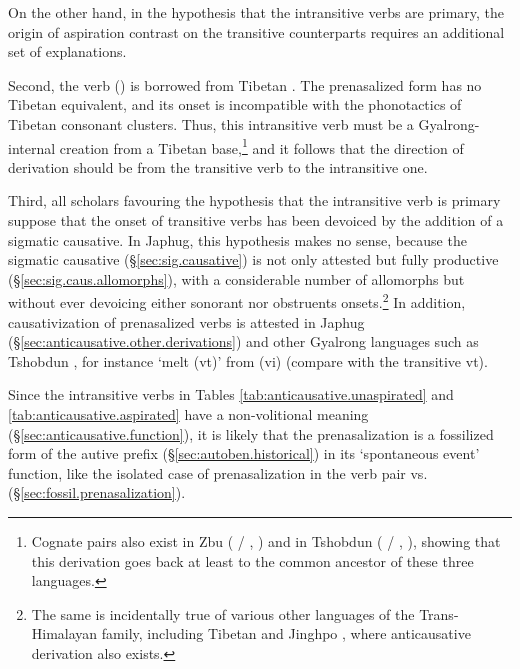 On the other hand, in the hypothesis that the intransitive verbs are primary, the origin of aspiration contrast on the transitive counterparts requires an additional set of explanations.

Second, the verb  () is borrowed from Tibetan . The prenasalized form  has no Tibetan equivalent, and its onset  is incompatible with the phonotactics of Tibetan consonant clusters. Thus, this intransitive verb must be a Gyalrong-internal creation from a Tibetan base,\footnote{Cognate pairs also exist in Zbu ( / , \citealt[271]{gong18these}) and in Tshobdun ( / , \citealt[345; 241]{jackson19tshobdun}), showing that this derivation goes back at least to the common ancestor of these three languages.  } and it follows that the direction of derivation should be from the transitive verb to the intransitive one.  

Third, all scholars favouring the hypothesis that the intransitive verb is primary suppose that the onset of transitive verbs has been devoiced by the addition of a sigmatic causative. In Japhug, this hypothesis makes no sense, because the sigmatic causative (§\ref{sec:sig.causative}) is not only attested but fully productive (§\ref{sec:sig.caus.allomorphs}), with a considerable number of allomorphs but without ever devoicing either sonorant nor obstruents onsets.\footnote{The same is incidentally true of various other languages of the Trans-Himalayan family, including Tibetan \citep{jacques12internal,hill14voicing} and Jinghpo \citep[78]{dai92yufa}, where anticausative derivation also exists. } In addition, causativization of prenasalized verbs is attested in Japhug (§\ref{sec:anticausative.other.derivations}) and other Gyalrong languages such as Tshobdun \citep{jackson14morpho}, for instance  `melt (vt)' from  (vi) (compare with the transitive  vt).

Since the intransitive verbs in Tables \ref{tab:anticausative.unaspirated} and \ref{tab:anticausative.aspirated} have a non-volitional meaning (§\ref{sec:anticausative.function}), it is likely that the prenasalization is a fossilized form of the autive  prefix (§\ref{sec:autoben.historical}) in its `spontaneous event' function, like the isolated case of prenasalization in the verb pair  vs.  (§\ref{sec:fossil.prenasalization}).

